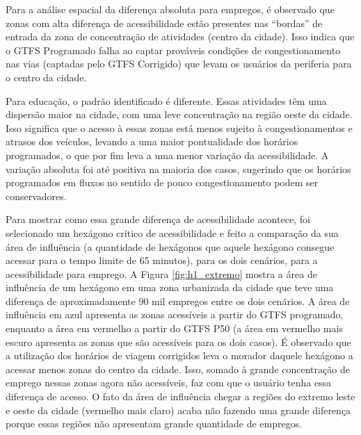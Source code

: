 \documentclass[        
    a4paper,          %
    12pt,             %
    chapter=TITLE,    %
    section=Title,    %
    subsection=Title, %
    oneside,          %
    english,          %
    spanish,          %
    brazil,           %
    fleqn             %
]{abntex2}
\begin{document}
  Para a análise espacial da diferença absoluta para empregos, é observado que zonas com alta diferença de acessibilidade estão presentes nas ``bordas'' de entrada da zona de concentração de atividades (centro da cidade). Isso indica que o GTFS Programado falha ao captar prováveis condições de congestionamento nas vias (captadas pelo GTFS Corrigido) que levam os usuários da periferia para o centro da cidade.
  
  Para educação, o padrão identificado é diferente. Essas atividades têm uma dispersão maior na cidade, com uma leve concentração na região oeste da cidade. Isso significa que o acesso à essas zonas está menos sujeito à congestionamentos e atrasos dos veículos, levando a uma maior pontualidade dos horários programados, o que por fim leva a uma menor variação da acessibilidade. A variação absoluta foi até positiva na maioria dos casos, sugerindo que os horários programados em fluxos no sentido de pouco congestionamento podem ser conservadores.
  
  Para mostrar como essa grande diferença de acessibilidade acontece, foi selecionado um hexágono crítico de acessibilidade e feito a comparação da sua área de influência (a quantidade de hexágonos que aquele hexágono consegue acessar para o tempo limite de 65 minutos), para os dois cenários, para a acessibilidade para emprego. A Figura \ref{fig:h1_extremo} mostra a área de influência de um hexágono em uma zona urbanizada da cidade que teve uma diferença de aproximadamente 90 mil empregos entre os dois cenários. A área de influência em azul apresenta as zonas acessíveis a partir do GTFS programado, enquanto a área em vermelho a partir do GTFS P50 (a área em vermelho mais escuro apresenta as zonas que são acessíveis para os dois casos). É observado que a utilização dos horários de viagem corrigidos leva o morador daquele hexágono a acessar menos zonas do centro da cidade. Isso, somado à grande concentração de emprego nessas zonas agora não acessíveis, faz com que o usuário tenha essa diferença de acesso. O fato da área de influência chegar a regiões do extremo leste e oeste da cidade (vermelho mais claro) acaba não fazendo uma grande diferença porque essas regiões não apresentam grande quantidade de empregos.
  
\end{document}
